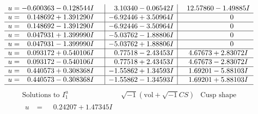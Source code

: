 \documentclass[1p]{elsarticle_modified}
\theoremstyle{definition}
\newcommand{\I}{\sqrt{-1}}
\begin{document}
$$\begin{array}{c|c|c}
\begin{aligned}
u &= -0.600363 - 0.128544 I\end{aligned}
 & \phantom{-}3.10340 - 0.06542 I & \phantom{-}12.57860 - 1.49885 I \\ \hline\begin{aligned}
u &= \phantom{-}0.148692 + 1.391290 I\end{aligned}
 & -6.92446 + 3.50964 I & \phantom{-0.000000 } 0 \\ \hline\begin{aligned}
u &= \phantom{-}0.148692 - 1.391290 I\end{aligned}
 & -6.92446 - 3.50964 I & \phantom{-0.000000 } 0 \\ \hline\begin{aligned}
u &= \phantom{-}0.047931 + 1.399990 I\end{aligned}
 & -5.03762 - 1.88806 I & \phantom{-0.000000 } 0 \\ \hline\begin{aligned}
u &= \phantom{-}0.047931 - 1.399990 I\end{aligned}
 & -5.03762 + 1.88806 I & \phantom{-0.000000 } 0 \\ \hline\begin{aligned}
u &= \phantom{-}0.093172 + 0.540106 I\end{aligned}
 & \phantom{-}0.77518 - 2.43453 I & \phantom{-}4.67673 + 2.83072 I \\ \hline\begin{aligned}
u &= \phantom{-}0.093172 - 0.540106 I\end{aligned}
 & \phantom{-}0.77518 + 2.43453 I & \phantom{-}4.67673 - 2.83072 I \\ \hline\begin{aligned}
u &= \phantom{-}0.440573 + 0.308368 I\end{aligned}
 & -1.55862 + 1.34593 I & \phantom{-}1.69201 - 5.88103 I \\ \hline\begin{aligned}
u &= \phantom{-}0.440573 - 0.308368 I\end{aligned}
 & -1.55862 - 1.34593 I & \phantom{-}1.69201 + 5.88103 I\\
 \hline 
 \end{array}$$\newpage$$\begin{array}{c|c|c}  
\text{Solutions to }I^u_{1}& \I (\text{vol} + \sqrt{-1}CS) & \text{Cusp shape}\\
 \hline 
\begin{aligned}
u &= \phantom{-}0.24207 + 1.47345 I\end{aligned}

\end{array}$$
\end{document}
